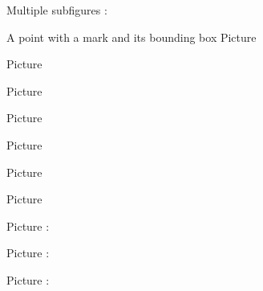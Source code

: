    \clearpage

Multiple subfigures :

A point with a mark and its bounding box
Picture 
\Huge

\begin{center}
   
\end{center}
\normalsize


Picture 
\begin{center}
   
\end{center}
   

Picture 
\begin{center}
   
\end{center}



Picture 
\begin{center}

\end{center}


Picture 
\begin{center}
   
\end{center}


Picture 
\begin{center}
   
\end{center}


Picture 
\begin{center}
   
\end{center}


Picture : 
\newcommand{\CaptionFigTKXZooLwXzjS}{Le champ de vecteurs $F(x,y)=\frac{1}{ x }(1,0)$.}
\begin{center}
   
\end{center}
   

Picture : 
\begin{center}
   
\end{center}
   


Picture : 
\begin{center}
   
\end{center}
   


